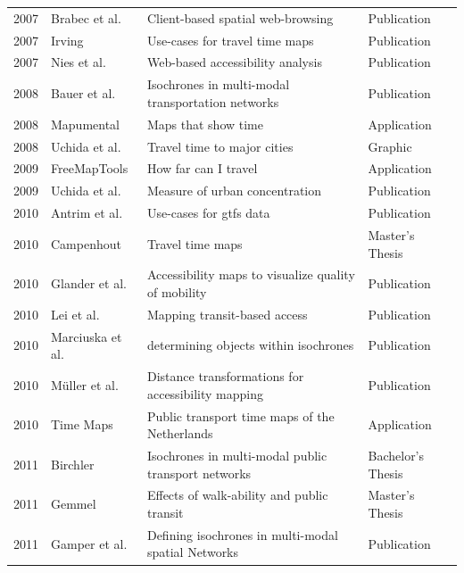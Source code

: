 \begin{table}[htp]
\begin{tabular}{r|l|l|l}
      2007 & Brabec et al. \cite{Brabec2007} & Client-based spatial web-browsing & Publication \\
      2007 & Irving \cite{Irving2007} & Use-cases for travel time maps  & Publication  \\
      2007 & Nies et al. \cite{neis2007webbasierte} & Web-based accessibility analysis  & Publication  \\
      2008 & Bauer et al. \cite{bauer2008computing} & Isochrones in multi-modal transportation networks  & Publication  \\
      2008 & Mapumental \cite{Mapumental}  &  Maps that show time & Application  \\
      2008 & Uchida et al. \cite{Uchida2008} & Travel time to major cities  & Graphic  \\
      2009 & FreeMapTools \cite{Freemaptools} & How far can I travel  & Application  \\
      2009 & Uchida et al. \cite{uchida2009agglomeration} & Measure of urban concentration  & Publication  \\
      2010 & Antrim et al. \cite{antrim2013many} & Use-cases for \acrshort{gtfs} data & Publication  \\
      2010 & Campenhout \cite{van2010travel} & Travel time maps  & Master's Thesis  \\
      2010 & Glander et al. \cite{Glander2010} & Accessibility maps to visualize quality of mobility  &  Publication \\
      2010 & Lei et al. \cite{lei2010mapping} & Mapping transit-based access  & Publication  \\
      2010 & Marciuska et al. \cite{marciuska2010determining} & determining objects within isochrones  & Publication  \\
      2010 & Müller et al. \cite{Mueller2010} & Distance transformations for accessibility mapping  &  Publication \\
      2010 & Time Maps \cite{TimeMaps} & Public transport time maps of the Netherlands & Application  \\
      2011 & Birchler \cite{birchler2011computing} & Isochrones in multi-modal public transport networks  & Bachelor's Thesis  \\
      2011 & Gemmel \cite{gemmel2012hedonic} &  Effects of walk-ability and public transit & Master's Thesis  \\
      2011 & Gamper et al. \cite{gamper2011defining} & Defining isochrones in multi-modal spatial Networks & Publication  \\

\end{tabular}
\end{table}
